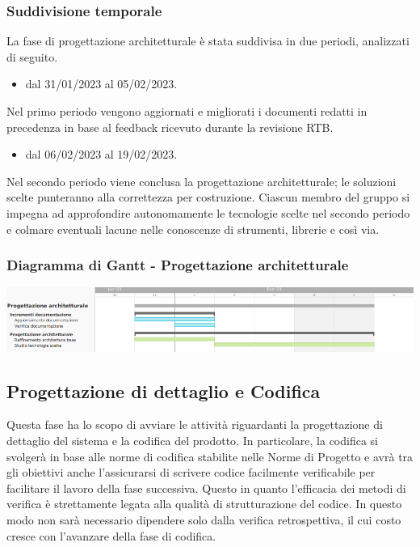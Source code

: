 \subsubsection{Suddivisione temporale}
La fase di progettazione architetturale è stata suddivisa in due periodi, analizzati di seguito.

\begin{itemize}
	\item dal 31/01/2023 al 05/02/2023.
\end{itemize}
Nel primo periodo vengono aggiornati e migliorati i documenti redatti in precedenza in base al feedback ricevuto durante la revisione RTB.

\begin{itemize}
	\item dal 06/02/2023 al 19/02/2023.
\end{itemize}
Nel secondo periodo viene conclusa la progettazione architetturale; le soluzioni scelte punteranno alla correttezza per costruzione. Ciascun membro del gruppo si impegna ad approfondire autonomamente le tecnologie scelte nel secondo periodo e colmare eventuali lacune nelle conoscenze di strumenti, librerie e così via.

\subsubsection{Diagramma di Gantt - Progettazione architetturale}
\includegraphics[width=\textwidth]{img/4_progettazione.png}\\

\subsection{Progettazione di dettaglio e Codifica}
Questa fase ha lo scopo di avviare le attività riguardanti la progettazione di dettaglio del sistema e la codifica del prodotto.
In particolare, la codifica si svolgerà in base alle norme di codifica stabilite nelle Norme di Progetto e avrà tra gli obiettivi anche l’assicurarsi di scrivere codice facilmente verificabile per facilitare il lavoro della fase successiva. Questo in quanto l'efficacia dei metodi di verifica è strettamente legata alla qualità di strutturazione del codice. In questo modo non sarà necessario dipendere solo dalla verifica retrospettiva, il cui costo cresce con l'avanzare della fase di codifica.

